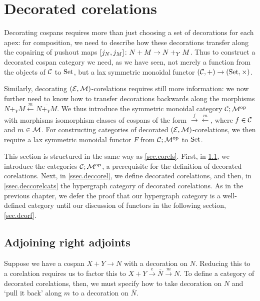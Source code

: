 \section{Decorated corelations} \label{sec:dcorc}

Decorating cospans requires more than just choosing a set of decorations for
each apex: for composition, we need to describe how these decorations transfer
along the copairing of pushout maps $[j_N,j_M]{\colon} N+M \to N+_YM$. Thus to
construct a decorated cospan category we need, as we have seen, not merely a
function from the objects of $\mathcal C$ to $\mathrm{Set}$, but a lax symmetric monoidal
functor $(\mathcal C,+) \to (\mathrm{Set},\times)$. 

Similarly, decorating $(\mathcal E,\mathcal M)$-corelations requires still more
information: we now further need to know how to transfer decorations backwards along the
morphisms $N+_YM \xleftarrow{m} \overline{N+_YM}$. We thus introduce the
symmetric monoidal category $\mathcal C;\mathcal M^{\mathrm{op}}$ with morphisms isomorphism
classes of cospans of the form $\xrightarrow{f}\xleftarrow{m}$, where $f \in \mathcal
C$ and $m \in \mathcal M$.  For constructing categories of decorated $(\mathcal E,\mathcal
M)$-corelations, we then require a lax symmetric monoidal functor $F$ from $\mathcal
C;\mathcal M^{\mathrm{op}}$ to $\mathrm{Set}$. 

This section is structured in the same way as \textsection\ref{sec.corels}.
First, in \textsection\ref{ssec.rightads}, we introduce the categories $\mathcal
C;\mathcal M^{\mathrm{op}}$, a prerequisite for the definition of decorated corelations. Next,
in \textsection\ref{ssec.deccorel}, we define decorated corelations, and then,
in \textsection\ref{ssec.deccorelcats} the hypergraph category of decorated
corelations. As in the previous chapter, we defer the proof that our hypergraph
category is a well-defined category until our discussion of functors in the
following section, \textsection\ref{sec.dcorf}.

\subsection{Adjoining right adjoints} \label{ssec.rightads}

Suppose we have a cospan $X+Y \to N$ with a decoration on $N$. Reducing this to
a corelation requires us to factor this to $X+Y \stackrel{e}\to \overline{N}
\stackrel{m}\to N$. To define a category of decorated corelations, then, we must
specify how to take decoration on $N$ and `pull it back' along $m$ to a decoration on
$\overline{N}$.

